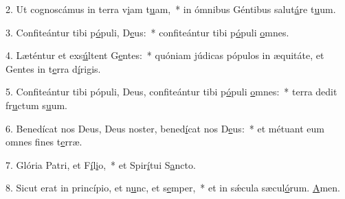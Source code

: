 2. Ut cognoscámus in terra v\uline{i}am t\uline{u}am,~* in ómnibus Géntibus salut\uline{á}re t\uline{u}um.\par 
3. Confiteántur tibi p\uline{ó}puli, D\uline{e}us:~* confiteántur tibi p\uline{ó}puli \uline{o}mnes.\par 
4. Læténtur et exs\uline{ú}ltent G\uline{e}ntes:~* quóniam júdicas pópulos in æquitáte, et Gentes in t\uline{e}rra d\uline{í}rigis.\par 
5. Confiteántur tibi pópuli, Deus, confiteántur tibi p\uline{ó}puli \uline{o}mnes:~* terra dedit fr\uline{u}ctum s\uline{u}um.\par 
6. Benedícat nos Deus, Deus noster, bened\uline{í}cat nos D\uline{e}us:~* et métuant eum omnes f\uline{i}nes t\uline{e}rræ.\par 
7. Glória Patri, et F\uline{í}l\uline{i}o,~* et Spir\uline{í}tui S\uline{a}ncto.\par 
8. Sicut erat in princípio, et n\uline{u}nc, et s\uline{e}mper,~* et in sǽcula sæcul\uline{ó}rum. \uline{A}men.\par 
